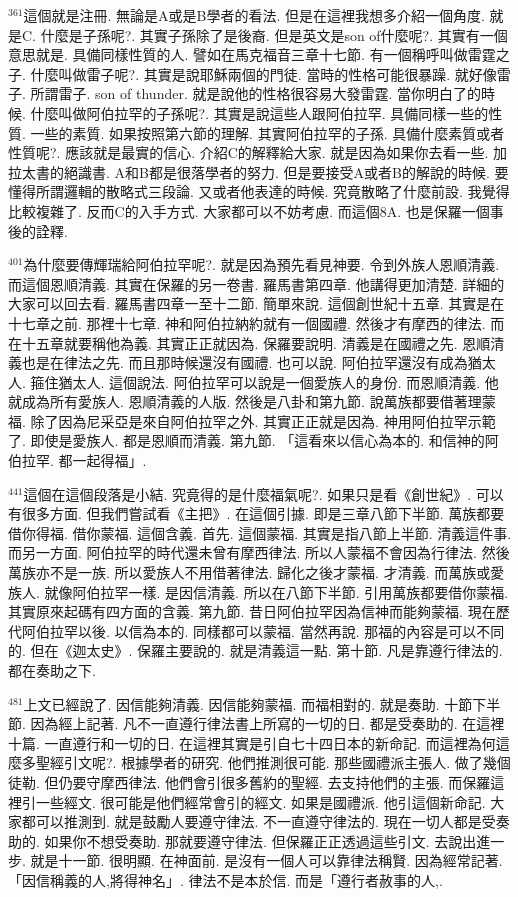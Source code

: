 \documentclass{book}
\begin{document}
$^{361}$這個就是注冊.
無論是A或是B學者的看法.
但是在這裡我想多介紹一個角度.
就是C.
什麼是子孫呢?.
其實子孫除了是後裔.
但是英文是son of什麼呢?.
其實有一個意思就是.
具備同樣性質的人.
譬如在馬克福音三章十七節.
有一個稱呼叫做雷霆之子.
什麼叫做雷子呢?.
其實是說耶穌兩個的門徒.
當時的性格可能很暴躁.
就好像雷子.
所謂雷子.
son of thunder.
就是說他的性格很容易大發雷霆.
當你明白了的時候.
什麼叫做阿伯拉罕的子孫呢?.
其實是說這些人跟阿伯拉罕.
具備同樣一些的性質.
一些的素質.
如果按照第六節的理解.
其實阿伯拉罕的子孫.
具備什麼素質或者性質呢?.
應該就是最實的信心.
介紹C的解釋給大家.
就是因為如果你去看一些.
加拉太書的絕識書.
A和B都是很落學者的努力.
但是要接受A或者B的解說的時候.
要懂得所謂邏輯的散略式三段論.
又或者他表達的時候.
究竟散略了什麼前設.
我覺得比較複雜了.
反而C的入手方式.
大家都可以不妨考慮.
而這個8A.
也是保羅一個事後的詮釋.

$^{401}$為什麼要傳輝瑞給阿伯拉罕呢?.
就是因為預先看見神要.
令到外族人恩順清義.
而這個恩順清義.
其實在保羅的另一卷書.
羅馬書第四章.
他講得更加清楚.
詳細的大家可以回去看.
羅馬書四章一至十二節.
簡單來說.
這個創世紀十五章.
其實是在十七章之前.
那裡十七章.
神和阿伯拉納約就有一個國禮.
然後才有摩西的律法.
而在十五章就要稱他為義.
其實正正就因為.
保羅要說明.
清義是在國禮之先.
恩順清義也是在律法之先.
而且那時候還沒有國禮.
也可以說.
阿伯拉罕還沒有成為猶太人.
箍住猶太人.
這個說法.
阿伯拉罕可以說是一個愛族人的身份.
而恩順清義.
他就成為所有愛族人.
恩順清義的人版.
然後是八卦和第九節.
說萬族都要借著理蒙福.
除了因為尼采亞是來自阿伯拉罕之外.
其實正正就是因為.
神用阿伯拉罕示範了.
即使是愛族人.
都是恩順而清義.
第九節.
「這看來以信心為本的.
和信神的阿伯拉罕.
都一起得福」.

$^{441}$這個在這個段落是小結.
究竟得的是什麼福氣呢?.
如果只是看《創世紀》.
可以有很多方面.
但我們嘗試看《主把》.
在這個引據.
即是三章八節下半節.
萬族都要借你得福.
借你蒙福.
這個含義.
首先.
這個蒙福.
其實是指八節上半節.
清義這件事.
而另一方面.
阿伯拉罕的時代還未曾有摩西律法.
所以人蒙福不會因為行律法.
然後萬族亦不是一族.
所以愛族人不用借著律法.
歸化之後才蒙福.
才清義.
而萬族或愛族人.
就像阿伯拉罕一樣.
是因信清義.
所以在八節下半節.
引用萬族都要借你蒙福.
其實原來起碼有四方面的含義.
第九節.
昔日阿伯拉罕因為信神而能夠蒙福.
現在歷代阿伯拉罕以後.
以信為本的.
同樣都可以蒙福.
當然再說.
那福的內容是可以不同的.
但在《迦太史》.
保羅主要說的.
就是清義這一點.
第十節.
凡是靠遵行律法的.
都在奏助之下.

$^{481}$上文已經說了.
因信能夠清義.
因信能夠蒙福.
而福相對的.
就是奏助.
十節下半節.
因為經上記著.
凡不一直遵行律法書上所寫的一切的日.
都是受奏助的.
在這裡十篇.
一直遵行和一切的日.
在這裡其實是引自七十四日本的新命記.
而這裡為何這麼多聖經引文呢?.
根據學者的研究.
他們推測很可能.
那些國禮派主張人.
做了幾個徒勒.
但仍要守摩西律法.
他們會引很多舊約的聖經.
去支持他們的主張.
而保羅這裡引一些經文.
很可能是他們經常會引的經文.
如果是國禮派.
他引這個新命記.
大家都可以推測到.
就是鼓勵人要遵守律法.
不一直遵守律法的.
現在一切人都是受奏助的.
如果你不想受奏助.
那就要遵守律法.
但保羅正正透過這些引文.
去說出進一步.
就是十一節.
很明顯.
在神面前.
是沒有一個人可以靠律法稱賢.
因為經常記著.
「因信稱義的人,將得神名」.
律法不是本於信.
而是「遵行者赦事的人,.
\end{document}
